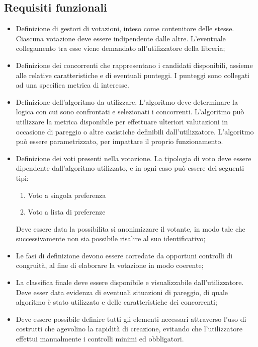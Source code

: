 \documentclass[12pt,a4paper,openright,twoside]{book}
\begin{document}
    \subsection{Requisiti funzionali}
    \begin{itemize}
        \item{Definizione di gestori di votazioni, inteso come contenitore delle stesse. Ciascuna votazione
        deve essere indipendente dalle altre. L'eventuale collegamento tra esse viene demandato all'utilizzatore della libreria;}
        \item{Definizione dei concorrenti che rappresentano i candidati disponibili, assieme alle relative caratteristiche e di
        eventuali punteggi.
        I punteggi sono collegati ad una specifica metrica di interesse.
        }
        \item{Definizione dell'algoritmo da utilizzare. L'algoritmo deve determinare la logica con cui sono
        confrontati e selezionati i concorrenti. L'algoritmo può utilizzare la metrica disponibile per
        effettuare ulteriori valutazioni in occasione di pareggio o altre casistiche definibili dall'utilizzatore.
        L'algoritmo può essere parametrizzato, per impattare il proprio funzionamento.   }
        \item{Definizione dei voti presenti nella votazione. La tipologia di voto deve essere dipendente dall'algoritmo utilizzato,
        e in ogni caso può essere dei seguenti tipi:
        \begin{enumerate}
            \label{tipidivoto}
            \item{Voto a singola preferenza}
            \item{Voto a lista di preferenze}
        \end{enumerate}
        Deve essere data la possibilita si anonimizzare il votante, in modo tale che successivamente non sia possibile risalire al suo identificativo;
        }
        \item{Le fasi di definizione devono essere corredate da opportuni controlli di congruità, al fine di elaborare la votazione in modo coerente;}
        \item{La classifica finale deve essere disponibile e visualizzabile dall'utilizzatore. Deve esser data evidenza
        di eventuali situazioni di pareggio, di quale algoritmo è stato utilizzato e delle caratteristiche dei concorrenti;}
        \item{Deve essere possibile definire tutti gli elementi necessari attraverso l'uso di costrutti che agevolino la rapidità di creazione,
        evitando che l'utilizzatore effettui manualmente i controlli minimi ed obbligatori.}
    \end{itemize}
\end{document}
